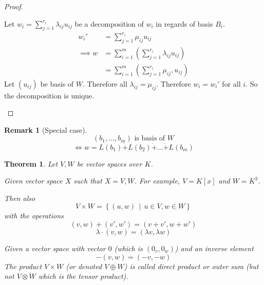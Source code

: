 \documentclass[a4paper,landscape,twocolumn]{article}
\newcommand\setdef[2]{\left\{#1\,\middle|\,#2\right\}}
\newtheorem{theorem}{Theorem}[section]
\newtheorem{rem}{Remark}[section]
\begin{document}
\begin{proof}
\begin{description}
      Let $w_i = \sum_{j=1}^{r_i} \lambda_{ij} u_{ij}$ be a decomposition of $w_i$ in regards of basis $B_i$.
      \begin{align*}
        w_i' &= \sum_{j=1}^{r_i} \mu_{ij} u_{ij} \\
        \implies w &= \sum_{i=1}^m \left(\sum_{j=1}^{r_i} \lambda_{ij} u_{ij}\right) \\
         &= \sum_{i=1}^m \left(\sum_{j=1}^{r_i} \mu_{ij}, u_{ij}\right)
      \end{align*}
      Let $(u_{ij})$ be basis of $W$. Therefore all $\lambda_{ij} = \mu_{ij}$.
      Therefore $w_i = w_i'$ for all $i$. So the decomposition is unique.
  \end{description}
\end{proof}

\begin{rem}[Special case]
  \[ (b_1, \dots, b_m) \text{ is basis of } W \]
  \[ \iff w = L(b_1) \dot{+} L(b_2) \dot{+} \dots \dot{+} L(b_m) \]
\end{rem}

\begin{theorem}
  \label{satz-4-16}
  Let $V, W$ be vector spaces over $K$.

  Given vector space $X$ such that $X = V,W$.
  For example, $V = K[x]$ and $W = K^3$.

  Then also
  \[ V \times W = \setdef{(u,w)}{u \in V, w \in W} \]
  with the operations
  \[ (v,w) + (v',w') = (v + v', w + w') \]
  \[ \lambda \cdot (v, w) = (\lambda v, \lambda w) \]

  Given a vector space with vector $0$ (which is $(0_v, 0_w)$)
  and an inverse element
  \[ -(v, w) = (-v, -w) \]
  The product $V \times W$ (or denoted $V \oplus W$)
  is called \emph{direct product} or \emph{outer sum}
  (but not $V \otimes W$ which is the tensor product).
\end{theorem}
\end{document}
